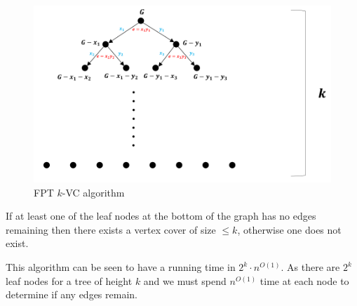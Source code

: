 \documentclass{article}
\begin{document}
\begin{figure}[ht]
  \centering
  \includegraphics[scale=0.7]{figures/l14-1.png}
  \caption{\label{fig:kvc}FPT $k$-VC algorithm }
\end{figure}

If at least one of the leaf nodes at the bottom of the graph has no edges remaining then there exists a vertex cover of size $\leq k$, otherwise one does not exist.

This algorithm can be seen to have a running time in $2^{k}\cdot n^{O(1)}$. As there are $2^{k}$ leaf nodes for a tree of height $k$ and we must spend $n^{O(1)}$ time at each node to determine if any edges remain.
\end{document}
